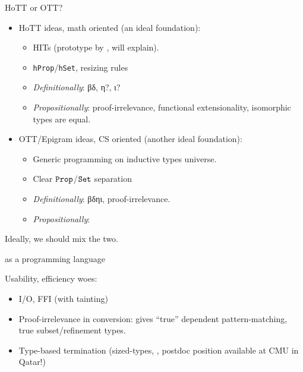 \begin{subsecframe}{HoTT or OTT?}

  \begin{itemize}
  \item 
    HoTT ideas, math oriented (an ideal foundation):
    \begin{itemize}
    \item HITs (prototype by ,  will
      explain).
    \item<presentation:only@0> \texttt{hProp}/\texttt{hSet}, resizing rules
    \item<presentation:only@0> \alert{\emph{Definitionally}}: βδ, η?, ι? 
    \item \alert{\emph{Propositionally}}: proof-irrelevance, functional extensionality,
      isomorphic types are equal.
    \end{itemize}
  \item 
    OTT/Epigram ideas, CS oriented (another ideal foundation):
    \begin{itemize}
    \item Generic programming on inductive types universe.
    \item<presentation:only@0> Clear $\texttt{Prop}$/$\texttt{Set}$ separation
    \item \alert{\emph{Definitionally}}: βδηι, proof-irrelevance.
    \item \alert{\emph{Propositionally}}: 
    \end{itemize}
  \end{itemize}
  
  Ideally, we should mix the two.
\end{subsecframe}

\begin{subsecframe}{\Coq as a programming language}

  Usability, efficiency woes:
  \begin{itemize}
  \item I/O, FFI (with tainting)
  \item Proof-irrelevance in conversion: gives ``true'' dependent
    pattern-matching, true subset/refinement types.
  \item Type-based termination (sized-types, ,
    \alert{postdoc position available} at CMU in Qatar!)
  \end{itemize}
\end{subsecframe}



